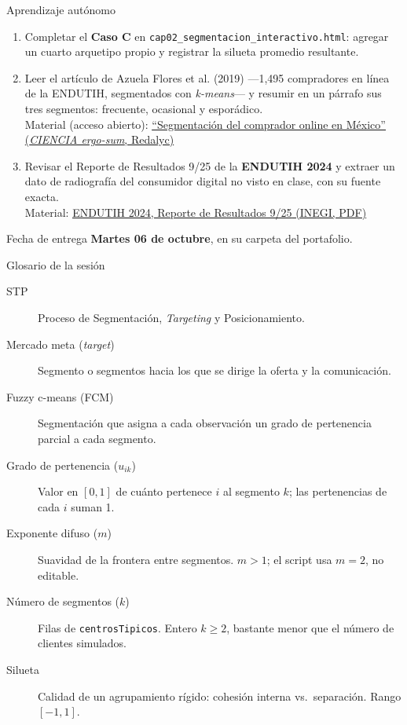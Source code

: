 \documentclass[aspectratio=169,xcolor=dvipsnames]{beamer}
\begin{document}
\begin{frame}{Aprendizaje autónomo}
\footnotesize
\begin{enumerate}
  \item Completar el \textbf{Caso C} en \texttt{cap02\_segmentacion\_\allowbreak interactivo.html}: agregar un cuarto arquetipo propio y registrar la silueta promedio resultante.
  \vspace{1pt}
  \item Leer el artículo de Azuela Flores et al. (2019) —1{,}495 compradores en línea de la ENDUTIH, segmentados con \textit{k-means}— y resumir en un párrafo sus tres segmentos: frecuente, ocasional y esporádico.\\
  {\scriptsize Material (acceso abierto): \href{https://www.redalyc.org/articulo.oa?id=10458194001}{\underline{\enquote{Segmentación del comprador online en México}} (\textit{CIENCIA ergo-sum}, Redalyc)}}
  \vspace{1pt}
  \item Revisar el Reporte de Resultados 9/25 de la \textbf{ENDUTIH 2024} y extraer un dato de radiografía del consumidor digital no visto en clase, con su fuente exacta.\\
  {\scriptsize Material: \href{https://www.inegi.org.mx/contenidos/saladeprensa/boletines/2025/endutih/ENDUTIH_24_RR.pdf}{\underline{ENDUTIH 2024, Reporte de Resultados 9/25} (INEGI, PDF)}}
\end{enumerate}
\vspace{2pt}
\begin{alertblock}{Fecha de entrega}
  \textbf{Martes 06 de octubre}, en su carpeta del portafolio.
\end{alertblock}
\end{frame}

\begin{frame}{Glosario de la sesión}
\scriptsize
\begin{description}
  \item[STP] Proceso de Segmentación, \textit{Targeting} y Posicionamiento.
  \item[Mercado meta (\textit{target})] Segmento o segmentos hacia los que se dirige la oferta y la comunicación.
  \item[Fuzzy c-means (FCM)] Segmentación que asigna a cada observación un grado de pertenencia parcial a cada segmento.
  \item[Grado de pertenencia ($u_{ik}$)] Valor en $[0,1]$ de cuánto pertenece $i$ al segmento $k$; las pertenencias de cada $i$ suman 1.
  \item[Exponente difuso ($m$)] Suavidad de la frontera entre segmentos. $m>1$; el script usa $m=2$, no editable.
  \item[Número de segmentos ($k$)] Filas de \texttt{centrosTipicos}. Entero $k\geq 2$, bastante menor que el número de clientes simulados.
  \item[Silueta] Calidad de un agrupamiento rígido: cohesión interna vs.\ separación. Rango $[-1,1]$.
\end{description}
\end{frame}
\end{document}
